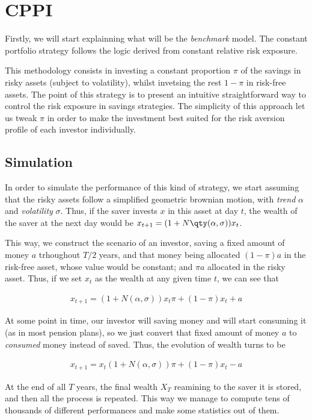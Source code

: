 \section{CPPI}

Firstly, we will start explainning what will be the \textit{benchmark} model. The constant portfolio strategy follows the logic derived from constant relative risk exposure.

This methodology consists in investing a constant proportion $\pi$ of the savings in risky assets (subject to volatility), whilst invetsing the rest $1 - \pi$ in risk-free assets. The point of this strategy is to present an intuitive straightforward way to control the risk exposure in savings strategies. The simplicity of this approach let us tweak $\pi$ in order to make the investment best suited for the risk aversion profile of each investor individually.

\subsection*{Simulation}

In order to simulate the performance of this kind of strategy, we start assuming that the risky assets follow a simplified geometric brownian motion, with \emph{trend} $\alpha$ and \emph{volatility} $\sigma$. Thus, if the saver invests $x$ in this asset at day $t$, the wealth of the saver at the next day would be $x_{t+1} = (1 + N\qty(\alpha, \sigma)) x_t$.

This way, we construct the scenario of an investor, saving a fixed amount of money $a$  trhoughout $T/2$ years, and that money being allocated $( 1 - \pi) a$ in the risk-free asset, whose value would be constant; and $\pi a$ allocated in the risky asset. Thus, if we set $x_t$ as the wealth at any given time $t$, we can see that

\begin{align}
	x_{t+1} = (1+N(\alpha, \sigma))x_{t}\pi + (1 - \pi)x_{t} + a
\end{align}

At some point in time, our investor will saving money and will start consuming it (as in most pension plans), so we just convert that fixed amount of money $a$ to \emph{consumed} money instead of saved. Thus, the evolution of wealth turns to be

\begin{align}
	x_{t+1} = x_{t}(1+N(\alpha, \sigma))\pi + (1 - \pi)x_{t} - a
\end{align}

At the end of all $T$ years, the final wealth $X_T$ reamining to the saver it is stored, and then all the process is repeated. This way we manage to compute tens of thousands of different performances and make some statistics out of them.

